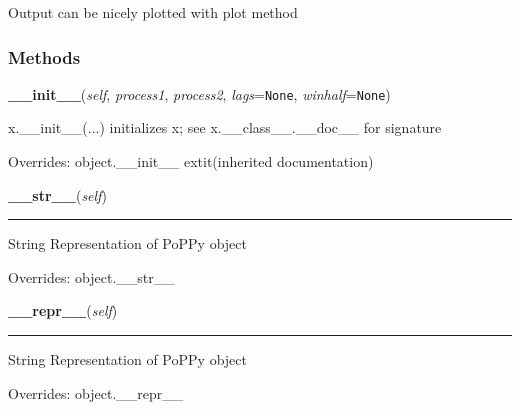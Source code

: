 Output can be nicely plotted with plot method



  \subsubsection{Methods}

    \vspace{0.5ex}

\hspace{.8\funcindent}\begin{boxedminipage}{\funcwidth}

    \raggedright \textbf{\_\_init\_\_}(\textit{self}, \textit{process1}, \textit{process2}, \textit{lags}={\tt None}, \textit{winhalf}={\tt None})

\setlength{\parskip}{2ex}
    x.\_\_init\_\_(...) initializes x; see x.\_\_class\_\_.\_\_doc\_\_ for 
    signature

\setlength{\parskip}{1ex}
      Overrides: object.\_\_init\_\_ 	extit{(inherited documentation)}

    \end{boxedminipage}

    \vspace{0.5ex}

\hspace{.8\funcindent}\begin{boxedminipage}{\funcwidth}

    \raggedright \textbf{\_\_str\_\_}(\textit{self})

    \vspace{-1.5ex}

    \rule{\textwidth}{0.5\fboxrule}
\setlength{\parskip}{2ex}
    String Representation of PoPPy object

\setlength{\parskip}{1ex}
      Overrides: object.\_\_str\_\_

    \end{boxedminipage}

    \vspace{0.5ex}

\hspace{.8\funcindent}\begin{boxedminipage}{\funcwidth}

    \raggedright \textbf{\_\_repr\_\_}(\textit{self})

    \vspace{-1.5ex}

    \rule{\textwidth}{0.5\fboxrule}
\setlength{\parskip}{2ex}
    String Representation of PoPPy object

\setlength{\parskip}{1ex}
      Overrides: object.\_\_repr\_\_

    \end{boxedminipage}

